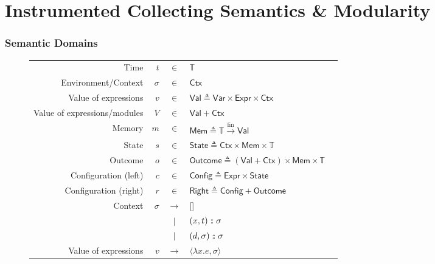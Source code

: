 \documentclass{beamer}
\theoremstyle{definition}
\newcommand*{\vbar}{|}
\newcommand*{\cons}{:{\hspace{-0.7em}}:}
\newcommand*{\Expr}{\mathsf{Expr}}
\newcommand*{\ExprVar}{\mathsf{Var}}
\newcommand*{\modid}{d}
\newcommand*{\Time}{\mathbb{T}}
\newcommand*{\ctx}{\sigma}
\newcommand*{\Ctx}{\mathsf{Ctx}}
\newcommand*{\Value}{\mathsf{Val}}
\newcommand*{\Mem}{\mathsf{Mem}}
\newcommand*{\mem}{m}
\newcommand*{\Config}{\mathsf{Config}}
\newcommand*{\config}{c}
\newcommand*{\Right}{\mathsf{Right}}
\newcommand*{\rightst}{r}
\newcommand*{\State}{\mathsf{State}}
\newcommand*{\Outcome}{\mathsf{Outcome}}
\newcommand*{\fin}[2]{{#1}\xrightarrow{\text{fin}}{#2}}
\begin{document}
\section{Instrumented Collecting Semantics \& Modularity}
\begin{frame}[c]
  \frametitle{Semantic Domains}
  \begin{figure}[h!]
    \footnotesize
    \centering
    \begin{tabular}{rrcll}
      Time                         & $t$        & $\in$         & $\Time$                                                  \\
      Environment/Context          & $\ctx$     & $\in$         & $\Ctx$                                                   \\
      Value of expressions         & $v$        & $\in$         & $\Value \triangleq\ExprVar\times\Expr\times\Ctx$         \\
      Value of expressions/modules & $V$        & $\in$         & $\Value+\Ctx$                                            \\
      Memory                       & $\mem$     & $\in$         & $\Mem \triangleq \fin{\Time}{\Value}$                    \\
      State                        & $s$        & $\in$         & $\State \triangleq \Ctx\times\Mem\times\Time$            \\
      Outcome                      & $o$        & $\in$         & $\Outcome \triangleq (\Value+\Ctx)\times\Mem\times\Time$ \\
      Configuration (left)         & $\config$  & $\in$         & $\Config\triangleq\Expr\times\State$                     \\
      Configuration (right)        & $\rightst$ & $\in$         & $\Right\triangleq\Config+\Outcome$                       \\
      Context                      & $\ctx$     & $\rightarrow$ & []                                                       \\
                                   &            & $\vbar$       & $(x,t)\cons \ctx$                                        \\
                                   &            & $\vbar$       & $(\modid,\ctx)\cons \ctx$                                \\
      Value of expressions         & $v$        & $\rightarrow$ & $\langle \lambda x.e, \ctx \rangle$\end{tabular}
  \end{figure}
\end{frame}
\end{document}
